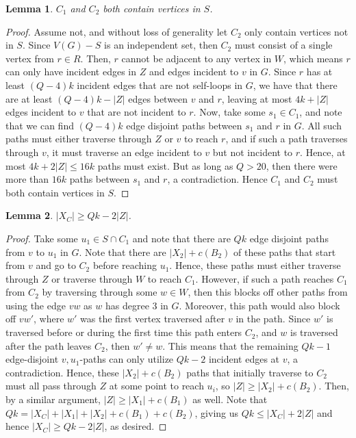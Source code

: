 \documentclass{article}
\newtheorem{lemma}{Lemma}[section]
\begin{document}
\begin{lemma}
    $C_1$ and $C_2$ both contain vertices in $S$.
\end{lemma}

\begin{proof}
    Assume not, and without loss of generality let $C_2$ only contain vertices not in $S$. Since $V(G)-S$ is an independent set, then $C_2$ must consist of a single vertex from $r \in R$. Then, $r$ cannot be adjacent to any vertex in $W$, which means $r$ can only have incident edges in $Z$ and edges incident to $v$ in $G$. Since $r$ has at least $(Q-4)k$ incident edges that are not self-loops in $G$, we have that there are at least $(Q-4)k-|Z|$ edges between $v$ and $r$, leaving at most $4k+|Z|$ edges incident to $v$ that are not incident to $r$. Now, take some $s_1 \in C_1$, and note that we can find $(Q-4)k$ edge disjoint paths between $s_1$ and $r$ in $G$. All such paths must either traverse through $Z$ or $v$ to reach $r$, and if such a path traverses through $v$, it must traverse an edge incident to $v$ but not incident to $r$. Hence, at most $4k+2|Z| \leq 16k$ paths must exist. But as long as $Q > 20$, then there were more than $16k$ paths between $s_1$ and $r$, a contradiction. Hence $C_1$ and $C_2$ must both contain vertices in $S$. 
\end{proof}

\begin{lemma}\label{lem:crossingboundS}
 $|X_C| \geq Qk-2|Z|$. 
\end{lemma}

\begin{proof}
    Take some $u_1 \in S \cap C_1$ and note that there are $Qk$ edge disjoint paths from $v$ to $u_1$ in $G$. Note that there are $|X_2|+c(B_2)$ of these paths that start from $v$ and go to $C_2$ before reaching $u_1$. Hence, these paths must either traverse through $Z$ or traverse through $W$ to reach $C_1$. However, if such a path reaches $C_1$ from $C_2$ by traversing through some $w \in W$, then this blocks off other paths from using the edge $vw$ as $w$ has degree 3 in $G$. Moreover, this path would also block off $vw'$, where $w'$ was the first vertex traversed after $v$ in the path. Since $w'$ is traversed before or during the first time this path enters $C_2$, and $w$ is traversed after the path leaves $C_2$, then $w' \not= w$. This means that the remaining $Qk-1$ edge-disjoint $v,u_1$-paths can only utilize $Qk-2$ incident edges at $v$, a contradiction. Hence, these $|X_2|+c(B_2)$ paths that initially traverse to $C_2$ must all pass through $Z$ at some point to reach $u_i$, so $|Z| \geq |X_2|+c(B_2)$. Then, by a similar argument, $|Z| \geq |X_1|+c(B_1)$ as well. Note that $Qk = |X_C|+|X_1|+|X_2|+c(B_1)+c(B_2)$, giving us $Qk \leq |X_C|+2|Z| $ and hence $|X_C| \geq Qk-2|Z|$, as desired.
\end{proof}
\end{document}
